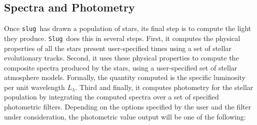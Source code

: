 \documentclass[12pt]{article}
\newcommand{\slug}{\texttt{slug}}
\newcommand{\Slug}{\texttt{Slug}}
\begin{document}
\subsection{Spectra and Photometry}
\label{ssec:spec_phot}

Once \slug\ has drawn a population of stars, its final step is to compute the light they produce. \Slug\ does this in several steps. First, it computes the physical properties of all the stars present user-specified times using a set of stellar evolutionary tracks. Second, it uses these physical properties to compute the composite spectra produced by the stars, using a user-specified set of stellar atmosphere models. Formally, the quantity computed is the specific luminosity per unit wavelength $L_\lambda$. Third and finally, it computes photometry for the stellar population by integrating the computed spectra over a set of specified photometric filters. Depending on the options specified by the user and the filter under consideration, the photometric value output will be one of the following:
\end{document}
